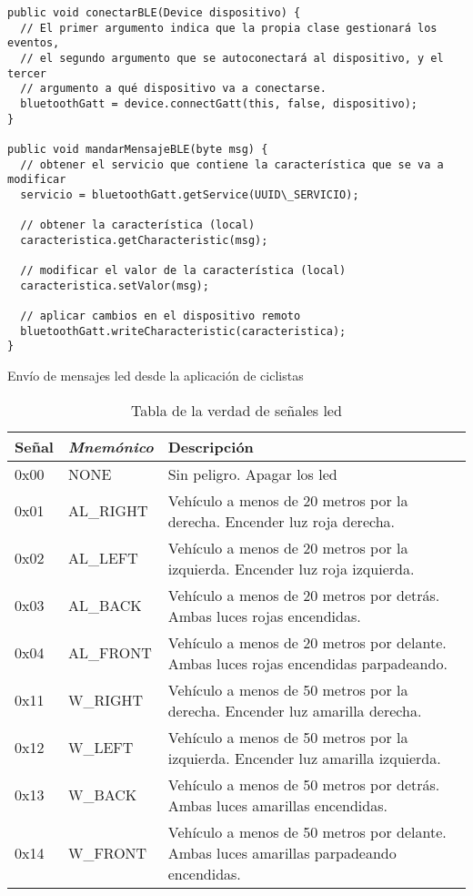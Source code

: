 \begin{description}
		\begin{listing}
			\begin{minipage}{.4\textwidth}
				\begin{verbatim}
public void conectarBLE(Device dispositivo) {
  // El primer argumento indica que la propia clase gestionará los eventos,
  // el segundo argumento que se autoconectará al dispositivo, y el tercer
  // argumento a qué dispositivo va a conectarse.
  bluetoothGatt = device.connectGatt(this, false, dispositivo);
}

public void mandarMensajeBLE(byte msg) {
  // obtener el servicio que contiene la característica que se va a modificar
  servicio = bluetoothGatt.getService(UUID\_SERVICIO);

  // obtener la característica (local)
  caracteristica.getCharacteristic(msg);

  // modificar el valor de la característica (local)
  caracteristica.setValor(msg);

  // aplicar cambios en el dispositivo remoto
  bluetoothGatt.writeCharacteristic(caracteristica);
}
				\end{verbatim}
			\end{minipage}
		\caption{Envío de mensajes led desde la aplicación de ciclistas}\label{alg:appciclistasBLE}
	\end{listing}
\end{description}

\begin{table}[H]
	\centering
	\caption{Tabla de la verdad de señales led}\label{tab:tablaVerdadLED}
	\begin{tabular}{lll}
		\toprule
		\textbf{Señal} & \emph{Mnemónico} & Descripción \\
		\midrule
		0x00 & NONE    & Sin peligro. Apagar los led \\
		0x01 & AL\_RIGHT & Vehículo a menos de 20 metros por la derecha. Encender luz
		roja derecha. \\
		0x02 & AL\_LEFT & Vehículo a menos de 20 metros por la izquierda. Encender luz
		roja izquierda. \\
		0x03 & AL\_BACK & Vehículo a menos de 20 metros por detrás. Ambas luces rojas
		encendidas. \\
		0x04 & AL\_FRONT & Vehículo a menos de 20 metros por delante. Ambas luces rojas
		encendidas parpadeando. \\
		0x11 & W\_RIGHT & Vehículo a menos de 50 metros por la derecha. Encender luz
		amarilla derecha. \\
		0x12 & W\_LEFT & Vehículo a menos de 50 metros por la izquierda. Encender luz
		amarilla izquierda. \\
		0x13 & W\_BACK & Vehículo a menos de 50 metros por detrás. Ambas luces amarillas
		encendidas. \\
		0x14 & W\_FRONT & Vehículo a menos de 50 metros por delante. Ambas luces amarillas
		parpadeando encendidas.\\
		\bottomrule
	\end{tabular}
\end{table}
